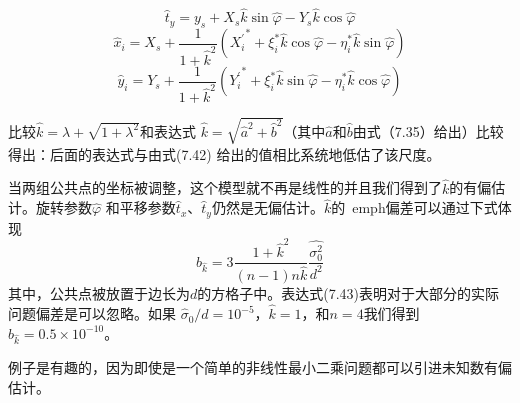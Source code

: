 \begin{equation*}
	\hat{t}_y = y_s + X_s\hat{k}\sin{\hat{\varphi}} - Y_s\hat{k}\cos{\hat{\varphi}}
\end{equation*}
\begin{equation*}
	\hat{x}_i = X_s + \frac{1}{1 + \hat{k}^2}({X_{i}^{'}}^\ast + \xi_{i}^{\ast}\hat{k}\cos\hat{\varphi} - \eta_{i}^{\ast}\hat{k}\sin\hat{\varphi})
\end{equation*}
\begin{equation*}
	\hat{y}_i =
	Y_s + \frac{1}{1 + \hat{k}^2}({Y_{i}^{'}}^\ast + \xi_{i}^{\ast}\hat{k}\sin\hat{\varphi} - \eta_{i}^{\ast}\hat{k}\cos\hat{\varphi})
\end{equation*}

比较$\hat{k} = \lambda + \sqrt{1 + \lambda^2}$和表达式 $\hat{k} = \sqrt{\hat{a}^2 + \hat{b}^2}$（其中$\hat{a}$和$\hat{b}$由式（7.35）给出）比较得出：后面的表达式与由式(7.42) 
给出的值相比系统地低估了该尺度。
\par
当两组公共点的坐标被调整，这个模型就不再是线性的并且我们得到了$\hat{k}$的有偏估计。旋转参数$\hat{\varphi}$ 和平移参数$\hat{t}_x$、$\hat{t}_y$仍然是无偏估计。$\hat{k}$的\
emph{偏差}可以通过下式体现
\begin{equation}
	b_{\hat{k}}
	= 3\frac{1 + \hat{k}^2}{(n - 1)n\hat{k}}\frac{\hat{\sigma_{0}^{2}}}{d^2}
\end{equation}
其中，公共点被放置于边长为$d$的方格子中。表达式(7.43)表明对于大部分的实际问题偏差是可以忽略。如果 $\hat{\sigma}_0/d = 10^{-5}$，$\hat{k} = 1$，和$n = 4$我们得到$b_{\hat{k}} = 
0.5 \times 10^{-10}$。
\par
例子是有趣的，因为即使是一个简单的非线性最小二乘问题都可以引进未知数有偏估计。